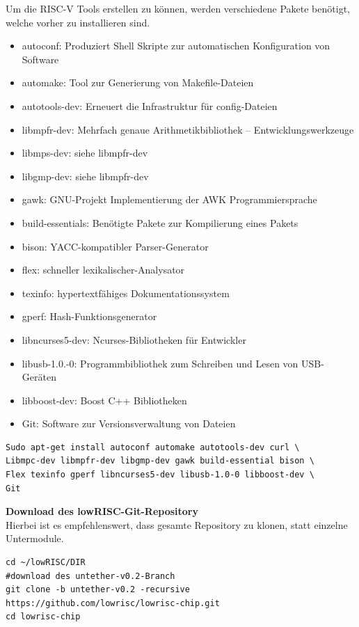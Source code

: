Um die RISC-V Tools erstellen zu können, werden verschiedene Pakete benötigt, welche vorher zu installieren sind.
\begin{itemize}
  \item autoconf: Produziert Shell Skripte zur automatischen Konfiguration von Software
  \item automake: Tool zur Generierung von Makefile-Dateien
  \item autotools-dev: Erneuert die Infrastruktur für config-Dateien
  \item libmpfr-dev: Mehrfach genaue Arithmetikbibliothek – Entwicklungswerkzeuge
  \item libmps-dev: siehe libmpfr-dev
  \item libgmp-dev: siehe libmpfr-dev
  \item gawk: GNU-Projekt Implementierung der AWK Programmiersprache
  \item build-essentials: Benötigte Pakete zur Kompilierung eines Pakets
  \item bison: YACC-kompatibler Parser-Generator
  \item flex: schneller lexikalischer-Analysator
  \item texinfo: hypertextfähiges Dokumentationssystem
  \item gperf: Hash-Funktionsgenerator
  \item libncurses5-dev: Ncurses-Bibliotheken für Entwickler
  \item libusb-1.0.-0: Programmbibliothek zum Schreiben und Lesen von USB-Geräten
  \item libboost-dev: Boost C++ Bibliotheken
  \item Git: Software zur Versionsverwaltung von Dateien
\end{itemize}


\begin{lstlisting}[caption={Installation der benötigten RISC-V-Tools},label={code:riscvtools}]
Sudo apt-get install autoconf automake autotools-dev curl \
Libmpc-dev libmpfr-dev libgmp-dev gawk build-essential bison \
Flex texinfo gperf libncurses5-dev libusb-1.0-0 libboost-dev \
Git
\end{lstlisting}


\textbf{Download des lowRISC-Git-Repository}\\

Hierbei ist es empfehlenswert, dass gesamte Repository zu klonen, statt einzelne Untermodule.\\

\begin{lstlisting}[caption={Download des Repositories},label={code:riscrepository}]
cd ~/lowRISC/DIR
#download des untether-v0.2-Branch
git clone -b untether-v0.2 -recursive https://github.com/lowrisc/lowrisc-chip.git
cd lowrisc-chip
\end{lstlisting}


